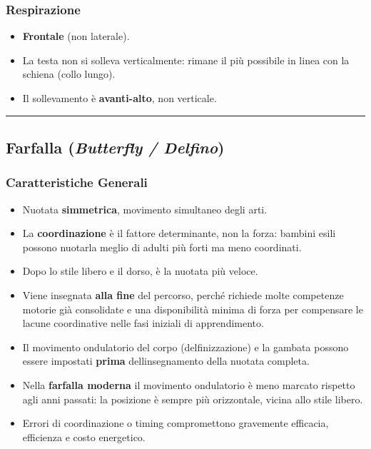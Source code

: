 \documentclass[a4paper,11pt]{article}
\providecommand{\tightlist}{%
  \setlength{\itemsep}{0pt}\setlength{\parskip}{0pt}}
\begin{document}
\subsubsection{Respirazione}\label{respirazione-2}

\begin{itemize}
      \tightlist
      \item
            \textbf{Frontale} (non laterale).
      \item
            La testa non si solleva verticalmente: rimane il più possibile in
            linea con la schiena (collo lungo).
      \item
            Il sollevamento è \textbf{avanti-alto}, non verticale.
\end{itemize}

\begin{center}\rule{0.5\linewidth}{0.5pt}\end{center}

\subsection{\texorpdfstring{Farfalla (\emph{Butterfly /
                  Delfino})}{Farfalla (Butterfly / Delfino)}}\label{farfalla-butterfly-delfino}

\subsubsection{Caratteristiche
      Generali}\label{caratteristiche-generali-3}

\begin{itemize}
      \tightlist
      \item
            Nuotata \textbf{simmetrica}, movimento simultaneo degli arti.
      \item
            La \textbf{coordinazione} è il fattore determinante, non la forza:
            bambini esili possono nuotarla meglio di adulti più forti ma meno
            coordinati.
      \item
            Dopo lo stile libero e il dorso, è la nuotata più veloce.
      \item
            Viene insegnata \textbf{alla fine} del percorso, perché richiede molte
            competenze motorie già consolidate e una disponibilità minima di forza
            per compensare le lacune coordinative nelle fasi iniziali di
            apprendimento.
      \item
            Il movimento ondulatorio del corpo (delfinizzazione) e la gambata
            possono essere impostati \textbf{prima}
            dell\textquotesingle insegnamento della nuotata completa.
      \item
            Nella \textbf{farfalla moderna} il movimento ondulatorio è meno
            marcato rispetto agli anni passati: la posizione è sempre più
            orizzontale, vicina allo stile libero.
      \item
            Errori di coordinazione o timing compromettono gravemente efficacia,
            efficienza e costo energetico.
\end{itemize}
\end{document}
